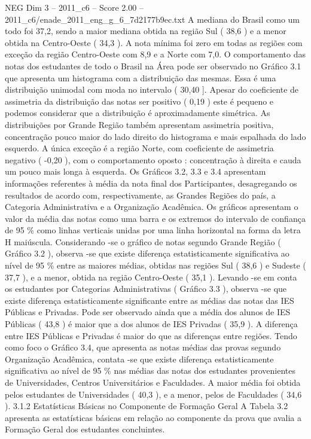 \begin{textsample}{NEG Dim 3 – 2011\_c6 – Score 2.00 – 2011\_c6/enade\_2011\_eng\_g\_6\_7d2177b9ec.txt}
A mediana do Brasil como um todo foi 37,2, sendo a maior mediana obtida na região Sul ( 38,6 ) e a menor obtida na Centro-Oeste ( 34,3 ).
A nota mínima foi zero em todas as regiões com exceção da região Centro-Oeste com 8,9 e a Norte com 7,0.
O comportamento das notas dos estudantes de todo o Brasil na Área pode ser observado no Gráfico 3.1 que apresenta um histograma com a distribuição das mesmas.
Essa é uma distribuição unimodal com moda no intervalo ( 30,40 ].
Apesar do coeficiente de assimetria da distribuição das notas ser positivo ( 0,19 ) este é pequeno e podemos considerar que a distribuição é aproximadamente simétrica.
As distribuições por Grande Região também apresentam assimetria positiva, concentração pouco maior do lado direito do histograma e mais espalhada do lado esquerdo.
A única exceção é a região Norte, com coeficiente de assimetria negativo ( -0,20 ), com o comportamento oposto : concentração à direita e cauda um pouco mais longa à esquerda.
Os Gráficos 3.2, 3.3 e 3.4 apresentam informações referentes à média da nota final dos Participantes, desagregando os resultados de acordo com, respectivamente, as Grandes Regiões do país, a Categoria Administrativa e a Organização Acadêmica.
Os gráficos apresentam o valor da média das notas como uma barra e os extremos do intervalo de confiança de 95 \% como linhas verticais unidas por uma linha horizontal na forma da letra H maiúscula.
Considerando -se o gráfico de notas segundo Grande Região ( Gráfico 3.2 ), observa -se que existe diferença estatisticamente significativa ao nível de 95 \% entre as maiores médias, obtidas nas regiões Sul ( 38,6 ) e Sudeste ( 37,7 ), e a menor, obtida na região Centro-Oeste ( 35,1 ).
Levando -se em conta os estudantes por Categorias Administrativas ( Gráfico 3.3 ), observa -se que existe diferença estatisticamente significante entre as médias das notas das IES Públicas e Privadas.
Pode ser observado ainda que a média dos alunos de IES Públicas ( 43,8 ) é maior que a dos alunos de IES Privadas ( 35,9 ).
A diferença entre IES Públicas e Privadas é maior do que as diferenças entre regiões.
Tendo como foco o Gráfico 3.4, que apresenta as notas médias das provas segundo Organização Acadêmica, contata -se que existe diferença estatisticamente significativa ao nível de 95 \% nas médias das notas dos estudantes provenientes de Universidades, Centros Universitários e Faculdades.
A maior média foi obtida pelos estudantes de Universidades ( 40,3 ), e a menor, pelos de Faculdades ( 34,6 ). 3.1.2 Estatísticas Básicas no Componente de Formação Geral A Tabela 3.2 apresenta as estatísticas básicas em relação ao componente da prova que avalia a Formação Geral dos estudantes concluintes.

\end{textsample}
